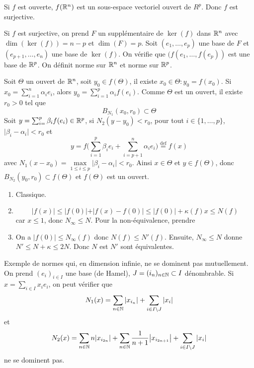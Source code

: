 \begin{solution}
	Si $f$ est ouverte, $f(\mathbb{R}^{n})$ est un sous-espace vectoriel ouvert de $R^{p}$. Donc $f$ est surjective.

	Si $f$ est surjective, on prend $F$ un supplémentaire de $\ker(f)$ dans $\mathbb{R}^{n}$ avec $\dim(\ker(f))=n-p$ et $\dim(F)=p$. Soit $(e_{1},\dots,e_{p})$ une base de $F$ et $(e_{p+1},\dots,e_{n})$ une base de $\ker(f)$. On vérifie que $(f(e_{1},\dots,f(e_{p}))$ est une base de $\mathbb{R}^{p}$. On définit 
	norme sur $\mathbb{R}^{n}$ et 
	norme sur $\mathbb{R}^{p}$.

	Soit $\Theta$ un ouvert de $\mathbb{R}^{n}$, soit $y_{0}\in f(\Theta)$, il existe $x_{0}\in\Theta\colon y_{0}=f(x_{0})$. Si $x_{0}=\sum_{i=1}^{n}\alpha_{i}e_{i}$, alors $y_{0}=\sum_{i=1}^{p}\alpha_{i}f(e_{i})$. Comme $\Theta$ est un ouvert, il existe $r_{0}>0$ tel que 
	$$B_{N_{1}}(x_{0},r_{0})\subset\Theta$$
	Soit $y=\sum_{i=}^{p}\beta_{i}f(e_{i})\in\mathbb{R}^{p}$, si $N_{2}(y-y_{0})<r_{0}$, pour tout $i\in\{1,\dots,p\}$, $\vert\beta_{i}-\alpha_{i}\vert<r_{0}$ et 
	$$y=f\Biggl(\sum_{i=1}^{p}\beta_{i}e_{i}+\sum_{i=p+1}^{n}\alpha_{i}e_{i}\Biggr)\overset{\text{def}}{=}f(x)$$
	avec $N_{1}(x-x_{0})=\max\limits_{1\leqslant i\leqslant p}\vert\beta_{i}-\alpha_{i}\vert<r_{0}$. Ainsi $x\in\Theta$ et $y\in f(\Theta)$, donc $B_{N_{2}}(y_{0},r_{0})\subset f(\Theta)$ et $f(\Theta)$ est un ouvert.
\end{solution}

\begin{solution}
	\phantom{}
	\begin{enumerate}
		\item Classique.
		\item $$\vert f(x)\vert\leqslant\vert f(0)\vert+\vert f(x)-f(0)\vert\leqslant\vert f(0)\vert+\kappa(f)x\leqslant N(f)$$
		car $x\leqslant 1$, donc $N_{\infty}\leqslant N$. Pour la non-équivalence, prendre 
		\item On a $\vert f(0)\vert\leqslant N_{\infty}(f)$ donc $N(f)\leqslant N'(f)$. Ensuite, $N_{\infty}\leqslant N$ donne $N'\leqslant N+\kappa\leqslant 2N$. Donc $N$ est $N'$ sont équivalentes.
	\end{enumerate}
\end{solution}

\begin{remark}
	Exemple de normes qui, en dimension infinie, ne se dominent pas mutuellement. On prend $(e_{i})_{i\in I}$ une base (de Hamel), $J=(i_{n})_{n\in\mathbb{N}}\subset I$ dénombrable. Si $x=\sum_{i\in I}x_{i}e_{i}$, on peut vérifier que 
	$$N_{1}(x)=\sum_{n\in\mathbb{N}}\vert x_{i_{n}}\vert+\sum_{i\in I\setminus J}\vert x_{i}\vert$$
	et
	$$N_{2}(x)=\sum_{n\in\mathbb{N}}n\vert x_{i_{2n}}\vert+\sum_{n\in\mathbb{N}}\frac{1}{n+1}\bigl\lvert x_{i_{2n+1}}\bigr\rvert+\sum_{i\in I\setminus J}\vert x_{i}\vert$$
	ne se dominent pas.
\end{remark}

